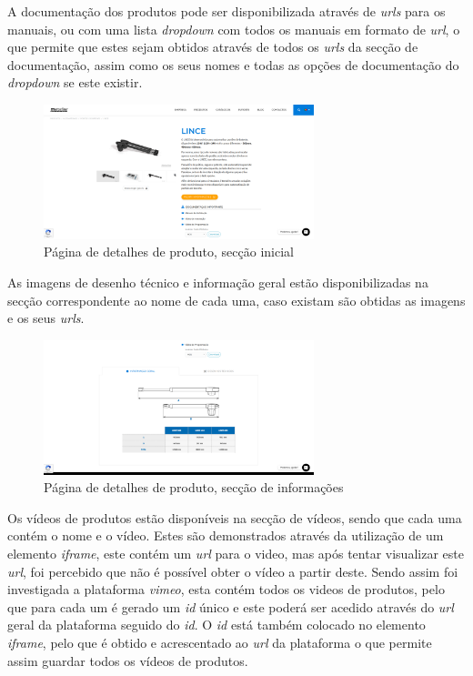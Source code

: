 A documentação dos produtos pode ser disponibilizada através de \textit{urls} para os manuais,
ou com uma lista \textit{dropdown} com todos os manuais em formato de \textit{url}, o que permite que estes sejam obtidos através de todos os \textit{urls} da secção de documentação, 
assim como os seus nomes e todas as opções de documentação do \textit{dropdown} se este existir.

\begin{figure}[htb]
    \centering
    
    \includegraphics[width=0.7\textwidth]{images/implementacao/scraper/pagina_detalhes_produto.png}
    \caption{Página de detalhes de produto, secção inicial}
    \label{fig:53}
\end{figure}

\newpage

As imagens de desenho técnico e informação geral estão disponibilizadas na secção correspondente
ao nome de cada uma, caso existam são obtidas as imagens e os seus \textit{urls}.

\begin{figure}[htb]
    \centering
    
    \includegraphics[width=0.7\textwidth]{images/implementacao/scraper/pagina_detalhes_desenhos.png}
    \caption{Página de detalhes de produto, secção de informações}
    \label{fig:54}
\end{figure}

Os vídeos de produtos estão disponíveis na secção de vídeos, sendo que cada uma contém o nome e o vídeo.
Estes são demonstrados através da utilização de um elemento \textit{iframe}, este contém um \textit{url} para o video, mas após tentar visualizar este \textit{url}, foi percebido que não é possível obter o vídeo a partir deste. Sendo assim foi investigada a plataforma \textit{vimeo}, esta contém todos os videos de produtos, pelo que para cada um é gerado um \textit{id} único e este poderá ser acedido através do \textit{url} geral da plataforma seguido 
do \textit{id}. O \textit{id} está também colocado no elemento \textit{iframe}, pelo que é obtido e acrescentado ao \textit{url} da plataforma o que permite assim guardar todos os vídeos de produtos.

